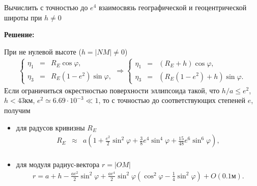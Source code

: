 \documentclass[a4paper,14pt]{article}
\theoremstyle{plain} %
\theoremstyle{definition} %
\theoremstyle{remark} %
\begin{document}
{Вычислить с точностью до $e^4$ взаимосвязь географической и геоцентрической широты при $h\neq0$

\textbf{Решение:}

\begin{figure}[htb]
\end{figure}
При не нулевой высоте ($h = |NM| \ne 0$)
\begin{eqnarray*}
    \left\{
    \begin{array}{ccc}
        \eta_1   & = & R_E\cos \varphi ,                      \\
        \eta_{3} & = & R_{E}\left(1 -e^2\right) \sin \varphi,
    \end{array}
    \right.
    \Rightarrow
    \left\{
    \begin{array}{ccc}
        \eta_1   & = & (R_E + h) \cos \varphi,                                \\
        \eta_{3} & = & \left(R_{E}\left(1 -e^2\right) + h\right)\sin \varphi.
    \end{array}
    \right.
\end{eqnarray*}
Если ограничиться окрестностью поверхности эллипсоида такой, что
$h/a \le e^2 $,  $h < 43 \mbox{км}$, $e^2 \simeq 6.69\cdot 10^{-3} \ll 1$,
то с точностью до соответствующих степеней $e$, получим
\begin{itemize}
    \item
          для радусов кривизны $R_E$
          \begin{eqnarray*}
              R_E &\approx&
              a\left( 1 +  \frac{e^2}{2}\sin^2\varphi +\frac{3}{8}e^4\sin^4\varphi +\frac{15}{48}e^6\sin^6\varphi\right), \nonumber \\
          \end{eqnarray*}

    \item
          для модуля радиус-вектора $r = |OM|$
          \begin{eqnarray*}
              r = a + h -\frac{ae^2}{2}\sin^2\varphi + \frac{ a e^4}{2} \sin^2 \varphi\left( \cos^2 \varphi - \frac{1}{4} \sin^2 \varphi \right)  + O(0.1 \mbox{м}).
          \end{eqnarray*}


\end{itemize}}
\end{document}
